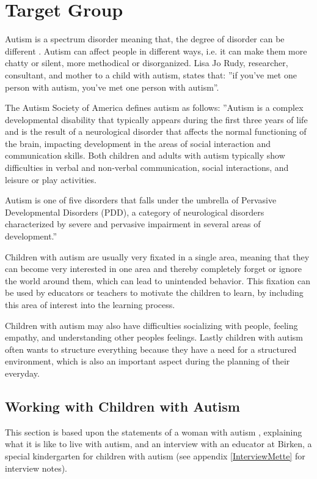 \section{Target Group}
Autism is a spectrum disorder meaning that, the degree of disorder can be different \cite{autism.about.com1}. Autism can affect people in different ways, i.e. it can make them more chatty or silent, more methodical or disorganized. Lisa Jo Rudy, researcher, consultant, and mother to a child with autism, states \cite{autism.about.com2} that: ''if you've met one person with autism, you've met one person with autism''.

The Autism Society of America defines autism \cite{definitionOfAutism} as follows: ''Autism is a complex developmental disability that typically appears during the first three years of life and is the result of a neurological disorder that affects the normal functioning of the brain, impacting development in the areas of social interaction and communication skills. Both children and adults with autism typically show difficulties in verbal and non-verbal communication, social interactions, and leisure or play activities.

Autism is one of five disorders that falls under the umbrella of Pervasive Developmental Disorders (PDD), a category of neurological disorders characterized by severe and pervasive impairment in several areas of development.''

Children with autism are usually very fixated in a single area, meaning that they can become very interested in one area and thereby completely forget or ignore the world around them, which can lead to unintended behavior. This fixation can be used by educators or teachers to motivate the children to learn, by including this area of interest into the learning process.

   Children with autism may also have difficulties socializing with people, feeling empathy, and understanding other peoples feelings. Lastly children with autism often wants to structure everything because they have a need for a structured environment, which is also an important aspect during the planning of their everyday.
   
\subsection{Working with Children with Autism}
This section is based upon the statements of a woman with autism \cite{autism.com}, explaining what it is like to live with autism, and an interview with an educator at Birken, a special kindergarten for children with autism (see appendix \ref{InterviewMette} for interview notes).

